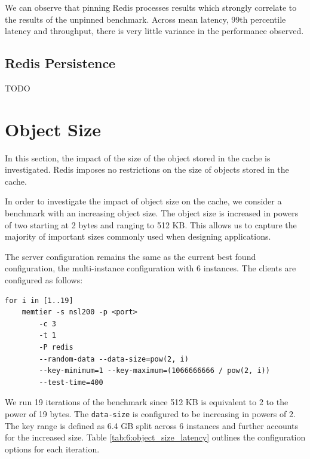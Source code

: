 We can observe that pinning  Redis processes results which strongly correlate to the results of the unpinned benchmark. Across mean latency, 99th percentile latency and throughput, there is very little variance in the performance observed.


\subsection{Redis Persistence}
TODO


\section{Object Size}
In this section, the impact of the size of the object stored in the cache is investigated. Redis imposes no restrictions on the size of objects stored in the cache.

In order to investigate the impact of object size on the cache, we consider a benchmark with an increasing object size. The object size is increased in powers of two starting at 2 bytes and ranging to 512 KB. This allows us to capture the majority of important sizes commonly used when designing applications.

The server configuration remains the same as the current best found configuration, the multi-instance configuration with 6 instances. The clients are configured as follows:

\begin{lstlisting}
for i in [1..19]
    memtier -s nsl200 -p <port>
        -c 3
        -t 1
        -P redis
        --random-data --data-size=pow(2, i)
        --key-minimum=1 --key-maximum=(1066666666 / pow(2, i))
        --test-time=400
\end{lstlisting}

We run 19 iterations of the benchmark since 512 KB is equivalent to 2 to the power of 19 bytes. The \texttt{data-size} is configured to be increasing in powers of 2. The key range is defined as 6.4 GB split across 6 instances and further accounts for the increased size. Table \ref{tab:6:object_size_latency} outlines the configuration options for each iteration.

